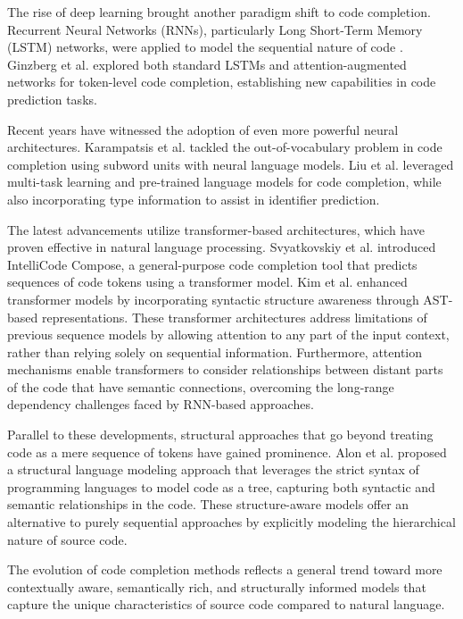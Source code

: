 The rise of deep learning brought another paradigm shift to code completion. Recurrent Neural Networks (RNNs), particularly Long Short-Term Memory (LSTM) networks, were applied to model the sequential nature of code \cite{nguyen2015}. Ginzberg et al. \cite{ginzberg2017} explored both standard LSTMs and attention-augmented networks for token-level code completion, establishing new capabilities in code prediction tasks.

Recent years have witnessed the adoption of even more powerful neural architectures. Karampatsis et al. \cite{karampatsis2019} tackled the out-of-vocabulary problem in code completion using subword units with neural language models. Liu et al. \cite{liu2020} leveraged multi-task learning and pre-trained language models for code completion, while also incorporating type information to assist in identifier prediction.

The latest advancements utilize transformer-based architectures, which have proven effective in natural language processing. Svyatkovskiy et al. \cite{svyatkovskiy2020} introduced IntelliCode Compose, a general-purpose code completion tool that predicts sequences of code tokens using a transformer model. Kim et al. \cite{kim2021} enhanced transformer models by incorporating syntactic structure awareness through AST-based representations. These transformer architectures address limitations of previous sequence models by allowing attention to any part of the input context, rather than relying solely on sequential information. Furthermore, attention mechanisms enable transformers to consider relationships between distant parts of the code that have semantic connections, overcoming the long-range dependency challenges faced by RNN-based approaches.

Parallel to these developments, structural approaches that go beyond treating code as a mere sequence of tokens have gained prominence. Alon et al. \cite{alon2020} proposed a structural language modeling approach that leverages the strict syntax of programming languages to model code as a tree, capturing both syntactic and semantic relationships in the code. These structure-aware models offer an alternative to purely sequential approaches by explicitly modeling the hierarchical nature of source code.

The evolution of code completion methods reflects a general trend toward more contextually aware, semantically rich, and structurally informed models that capture the unique characteristics of source code compared to natural language.

